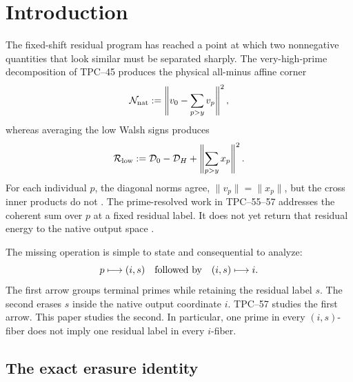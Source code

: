 \section{Introduction}
\label{sec:tpc58-introduction}

The fixed-shift residual program has reached a point at which two
nonnegative quantities that look similar must be separated sharply.
The very-high-prime decomposition of TPC--45 produces the physical
all-minus affine corner
\begin{equation}
 \mathcal N_{\rm nat}
 :=\left\|v_0-\sum_{p>y}v_p\right\|^2,
 \label{eq:tpc58-intro-native}
\end{equation}
whereas averaging the low Walsh signs produces
\begin{equation}
 \mathcal R_{\rm low}
 :=\mathcal D_0-\mathcal D_H
   +\left\|\sum_{p>y}x_p\right\|^2.
 \label{eq:tpc58-intro-residual}
\end{equation}
For each individual \(p\), the diagonal norms agree,
\(\|v_p\|=\|x_p\|\), but the cross inner products do not
\citep{WangTPC45}.  The prime-resolved work in TPC--55--57 addresses the
coherent sum over \(p\) at a fixed residual label.  It does not yet
return that residual energy to the native output space
\citep{WangTPC55,WangTPC56,WangTPC57}.

The missing operation is simple to state and consequential to analyze:
\begin{equation}
 p\longmapsto(i,s)
 \quad\hbox{followed by}\quad
 (i,s)\longmapsto i.
 \label{eq:tpc58-two-groupings}
\end{equation}
The first arrow groups terminal primes while retaining the residual
label \(s\).  The second erases \(s\) inside the native output coordinate
\(i\).  TPC--57 studies the first arrow.  This paper studies the second.
In particular, one prime in every \((i,s)\)-fiber does not imply one
residual label in every \(i\)-fiber.

\subsection{The exact erasure identity}

